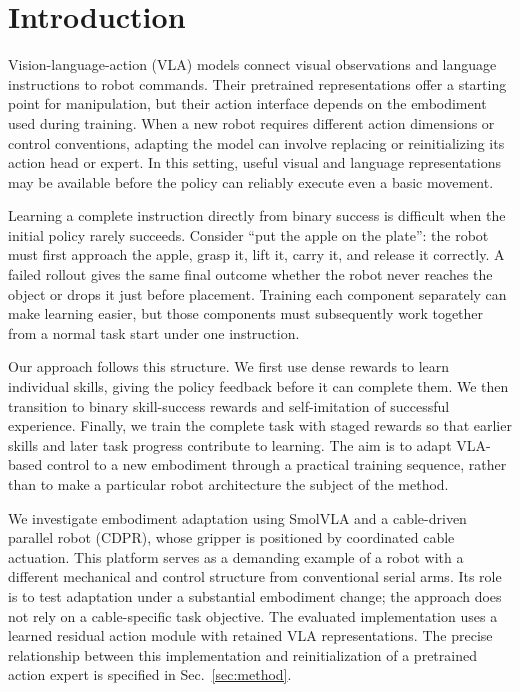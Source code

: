\section{Introduction}\label{sec:introduction}
Vision-language-action (VLA) models connect visual observations and language instructions to robot commands. Their pretrained representations offer a starting point for manipulation, but their action interface depends on the embodiment used during training. When a new robot requires different action dimensions or control conventions, adapting the model can involve replacing or reinitializing its action head or expert. In this setting, useful visual and language representations may be available before the policy can reliably execute even a basic movement.

Learning a complete instruction directly from binary success is difficult when the initial policy rarely succeeds. Consider ``put the apple on the plate'': the robot must first approach the apple, grasp it, lift it, carry it, and release it correctly. A failed rollout gives the same final outcome whether the robot never reaches the object or drops it just before placement. Training each component separately can make learning easier, but those components must subsequently work together from a normal task start under one instruction.

Our approach follows this structure. We first use dense rewards to learn individual skills, giving the policy feedback before it can complete them. We then transition to binary skill-success rewards and self-imitation of successful experience. Finally, we train the complete task with staged rewards so that earlier skills and later task progress contribute to learning. The aim is to adapt VLA-based control to a new embodiment through a practical training sequence, rather than to make a particular robot architecture the subject of the method.

We investigate embodiment adaptation using SmolVLA and a cable-driven parallel robot (CDPR), whose gripper is positioned by coordinated cable actuation. This platform serves as a demanding example of a robot with a different mechanical and control structure from conventional serial arms. Its role is to test adaptation under a substantial embodiment change; the approach does not rely on a cable-specific task objective. The evaluated implementation uses a learned residual action module with retained VLA representations. The precise relationship between this implementation and reinitialization of a pretrained action expert is specified in Sec.~\ref{sec:method}.

